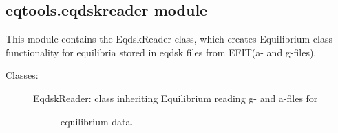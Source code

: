 \documentclass[letterpaper,10pt,english]{sphinxmanual}
\begin{document}
\subsection{eqtools.eqdskreader module}
\label{eqtools:eqtools-eqdskreader-module}\label{eqtools:module-eqtools.eqdskreader}
This module contains the EqdskReader class, which creates Equilibrium class
functionality for equilibria stored in eqdsk files from EFIT(a- and g-files).
\begin{description}
\item[{Classes:}] \leavevmode\begin{description}
\item[{EqdskReader: class inheriting Equilibrium reading g- and a-files for}] \leavevmode
equilibrium data.

\end{description}

\end{description}
\end{document}
